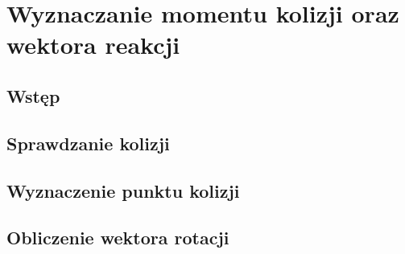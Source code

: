 \chapter{Wyznaczanie momentu kolizji oraz wektora reakcji}

\section{Wstęp}

\section{Sprawdzanie kolizji}

\section{Wyznaczenie punktu kolizji}

\section{Obliczenie wektora rotacji}